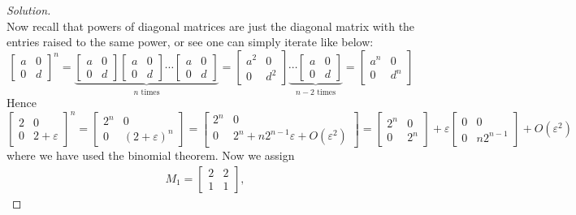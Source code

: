 \documentclass{article}
\newcommand{\ep}{{\varepsilon}}
\begin{document}
\begin{enumerate}
\begin{proof}[Solution]
\[		\]
		Now recall that powers of diagonal matrices are just the diagonal
		matrix with the entries raised to the same power,
		or see one can simply iterate like below:
		\[
			\begin{bmatrix} a & 0 \\ 0 & d \end{bmatrix}^n = 
			\underbrace{\begin{bmatrix} a & 0 \\ 0 & d \end{bmatrix}
			\begin{bmatrix} a & 0 \\ 0 & d \end{bmatrix}
		\cdots \begin{bmatrix} a & 0 \\ 0 & d \end{bmatrix}}_{n\text{ times}}
			= \begin{bmatrix} a^2 & 0 \\ 0 & d^2 \end{bmatrix} \underbrace{\cdots 
			\begin{bmatrix} a & 0 \\ 0 & d \end{bmatrix}}_{n-2\text{ times}}
			= \begin{bmatrix} a^n & 0 \\ 0 & d^n \end{bmatrix}
		\]
		Hence
		\[
			\begin{bmatrix} 2 & 0 \\ 0 & 2 + \ep \end{bmatrix}^n
			= \begin{bmatrix} 2^n & 0 \\ 0 & (2+\ep)^n \end{bmatrix}
			= \begin{bmatrix} 2^n & 0 \\ 0 & 2^n+n2^{n-1}\ep + O(\ep^2)\end{bmatrix}
			= \begin{bmatrix}2^n & 0 \\ 0 & 2^n \end{bmatrix}
			+ \ep\begin{bmatrix} 0 & 0 \\ 0 & n2^{n-1}\end{bmatrix} + O(\ep^2)
		\]
		where we have used the binomial theorem.
		Now we assign
		\begin{align*}
			M_1 = \begin{bmatrix} 2 & 2 \\ 1 & 1 \end{bmatrix},\quad

\end{align*}
\end{proof}
\end{enumerate}
\end{document}
